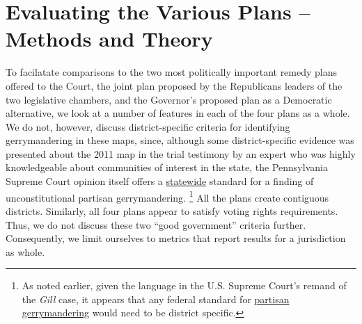 \par
    \section{Evaluating the Various Plans -- Methods and Theory}
    To facilatate comparisons to the two most politically important remedy plans offered to the Court, the joint plan proposed by the Republicans leaders of the two legislative chambers, and the Governor’s proposed plan as a Democratic alternative, we look at a number of features in each of the four plans as a whole. We do not, however, discuss district-specific criteria for identifying gerrymandering in these maps, since, although some district-specific evidence was presented about the 2011 map in the trial testimony by an expert who was highly knowledgeable about communities of interest in the state, the Pennsylvania Supreme Court opinion itself offers a \underline{statewide} standard for a finding of unconstitutional partisan gerrymandering. 
        \footnote{As noted earlier, given the language in the U.S. Supreme Court’s remand of the \textit{Gill} case, it appears that any federal standard for \underline{partisan gerrymandering} would need to be district specific.}
    All the plans create contiguous districts. Similarly, all four plans appear to satisfy voting rights requirements. Thus, we do not discuss these two ``good government” criteria further. Consequently, we limit ourselves to metrics that report results for a jurisdiction as whole. 
\par
